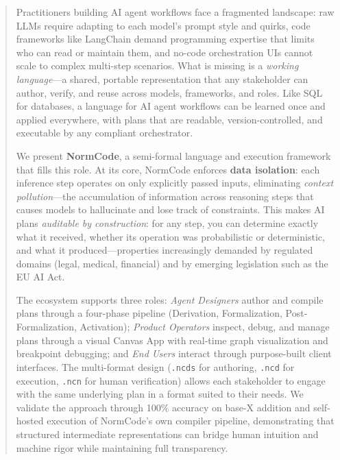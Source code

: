 \begin{abstract}
Practitioners building AI agent workflows face a fragmented landscape: raw LLMs require adapting to each model's prompt style and quirks, code frameworks like LangChain demand programming expertise that limits who can read or maintain them, and no-code orchestration UIs cannot scale to complex multi-step scenarios. What is missing is a \textit{working language}---a shared, portable representation that any stakeholder can author, verify, and reuse across models, frameworks, and roles. Like SQL for databases, a language for AI agent workflows can be learned once and applied everywhere, with plans that are readable, version-controlled, and executable by any compliant orchestrator.

We present \textbf{NormCode}, a semi-formal language and execution framework that fills this role. At its core, NormCode enforces \textbf{data isolation}: each inference step operates on only explicitly passed inputs, eliminating \textit{context pollution}---the accumulation of information across reasoning steps that causes models to hallucinate and lose track of constraints. This makes AI plans \textit{auditable by construction}: for any step, you can determine exactly what it received, whether its operation was probabilistic or deterministic, and what it produced---properties increasingly demanded by regulated domains (legal, medical, financial) and by emerging legislation such as the EU AI Act.

The ecosystem supports three roles: \textit{Agent Designers} author and compile plans through a four-phase pipeline (Derivation, Formalization, Post-Formalization, Activation); \textit{Product Operators} inspect, debug, and manage plans through a visual Canvas App with real-time graph visualization and breakpoint debugging; and \textit{End Users} interact through purpose-built client interfaces. The multi-format design (\texttt{.ncds} for authoring, \texttt{.ncd} for execution, \texttt{.ncn} for human verification) allows each stakeholder to engage with the same underlying plan in a format suited to their needs. We validate the approach through 100\% accuracy on base-X addition and self-hosted execution of NormCode's own compiler pipeline, demonstrating that structured intermediate representations can bridge human intuition and machine rigor while maintaining full transparency.
\end{abstract}
